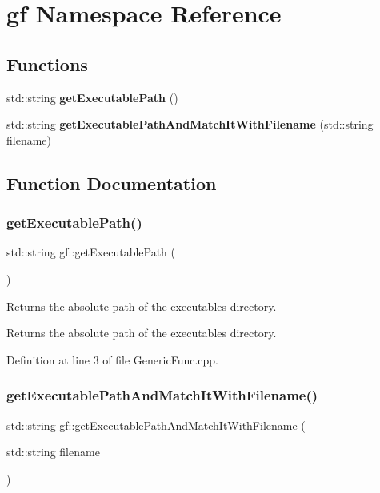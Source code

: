 \section{gf Namespace Reference}
\label{namespacegf}
\subsection*{Functions}
\begin{DoxyCompactItemize}
\item 
std\+::string \textbf{ get\+Executable\+Path} ()
\item 
std\+::string \textbf{ get\+Executable\+Path\+And\+Match\+It\+With\+Filename} (std\+::string filename)
\end{DoxyCompactItemize}


\subsection{Function Documentation}
\mbox{\label{namespacegf_ac0f4b1cee2681a53cb7c513c7f9a3b6f}} 
\subsubsection{get\+Executable\+Path()}
{\footnotesize\ttfamily std\+::string gf\+::get\+Executable\+Path (\begin{DoxyParamCaption}{ }\end{DoxyParamCaption})}

Returns the absolute path of the executable\textquotesingle{}s directory. \begin{DoxyReturn}{Returns}
the absolute path of the executable\textquotesingle{}s directory. 
\end{DoxyReturn}


Definition at line 3 of file Generic\+Func.\+cpp.

\mbox{\label{namespacegf_a00f9f0ea9a0804a71cf70c6b1eb158cf}} 
\subsubsection{get\+Executable\+Path\+And\+Match\+It\+With\+Filename()}
{\footnotesize\ttfamily std\+::string gf\+::get\+Executable\+Path\+And\+Match\+It\+With\+Filename (\begin{DoxyParamCaption}\item[{std\+::string}]{filename }\end{DoxyParamCaption})}

